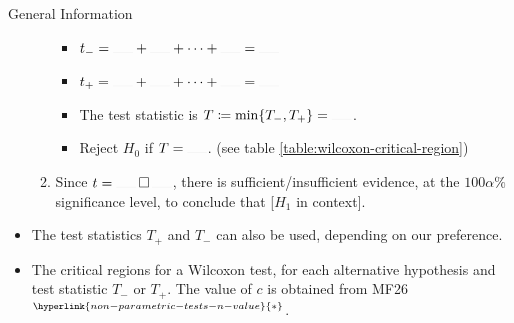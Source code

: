 \documentclass[../Notes.tex]{subfiles}
\begin{document}
\begin{stbox}{General Information}
\begin{itemize}
\begin{enumerate}
\begin{itemize}[label=\(\circ\)]
        \item \(t_{-}=\rule{0.5cm}{0.01mm}+\rule{0.5cm}{0.01mm}+\dots+\rule{0.5cm}{0.01mm}=\rule{0.5cm}{0.01mm}\)
        \item \(t_{+}=\rule{0.5cm}{0.01mm}+\rule{0.5cm}{0.01mm}+\dots+\rule{0.5cm}{0.01mm}=\rule{0.5cm}{0.01mm}\)
        \item The test statistic is \(T\coloneq\min\{T_{-},T_{+}\}=\rule{0.5cm}{0.01mm}\).
        \item Reject \(H_0\) if \(T=\rule{0.5cm}{0.01mm}\). (see table \ref{table:wilcoxon-critical-region})
      \end{itemize}
      \item Since \(t=\rule{0.5cm}{0.01mm}\,\square\, \rule{0.5cm}{0.01mm}\), there is sufficient/insufficient evidence, at the \(100\alpha\%\) significance level, to conclude that [\(H_1\) in context].
    \end{enumerate}
    \item The test statistics \(T_{+}\) and \(T_{-}\) can also be used, depending on our preference.
      \item The critical regions for a Wilcoxon test, for each alternative hypothesis and test statistic \(T_{-}\) or \(T_{+}\). The value of \(c\) is obtained from MF26\(^{\hyperlink{non-parametric-tests-n-value}{*}}\). 
      

\end{itemize}
\end{stbox}
\end{document}
